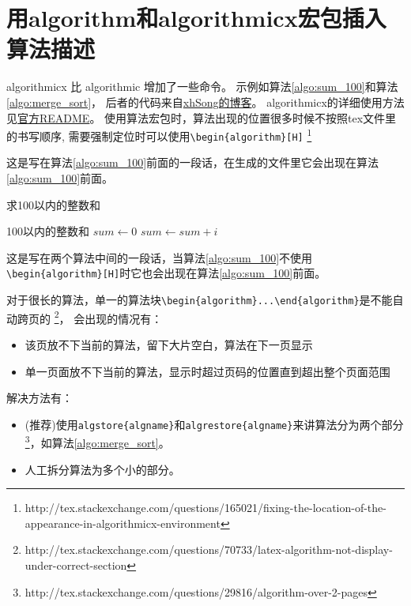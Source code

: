 \section{用algorithm和algorithmicx宏包插入算法描述}

algorithmicx 比 algorithmic 增加了一些命令。
示例如算法\ref{algo:sum_100}和算法\ref{algo:merge_sort}，
后者的代码来自\href{http://hustsxh.is-programmer.com/posts/38801.html}{xhSong的博客}。
algorithmicx的详细使用方法见\href{http://mirror.hust.edu.cn/CTAN/macros/latex/contrib/algorithmicx/algorithmicx.pdf}{官方README}。
使用算法宏包时，算法出现的位置很多时候不按照tex文件里的书写顺序, 
需要强制定位时可以使用\verb+\begin{algorithm}[H]+
\footnote{http://tex.stackexchange.com/questions/165021/fixing-the-location-of-the-appearance-in-algorithmicx-environment}

这是写在算法\ref{algo:sum_100}前面的一段话，在生成的文件里它会出现在算法\ref{algo:sum_100}前面。

\begin{algorithm}
\caption{求100以内的整数和}
\label{algo:sum_100}
\begin{algorithmic}[1] %
\Ensure 100以内的整数和 %
\State $sum \gets 0$
    \State $sum \gets sum + i$
  \EndFor
\end{algorithmic}
\end{algorithm}

这是写在两个算法中间的一段话，当算法\ref{algo:sum_100}不使用\verb+\begin{algorithm}[H]+时它也会出现在算法\ref{algo:sum_100}前面。

对于很长的算法，单一的算法块\verb+\begin{algorithm}...\end{algorithm}+是不能自动跨页的
\footnote{http://tex.stackexchange.com/questions/70733/latex-algorithm-not-display-under-correct-section}，
会出现的情况有：

\begin{itemize}
  \item 该页放不下当前的算法，留下大片空白，算法在下一页显示
  \item 单一页面放不下当前的算法，显示时超过页码的位置直到超出整个页面范围
\end{itemize}

解决方法有：

\begin{itemize}
  \item (推荐)使用\verb+algstore{algname}+和\verb+algrestore{algname}+来讲算法分为两个部分\footnote{http://tex.stackexchange.com/questions/29816/algorithm-over-2-pages}，如算法\ref{algo:merge_sort}。
  \item 人工拆分算法为多个小的部分。
\end{itemize}

